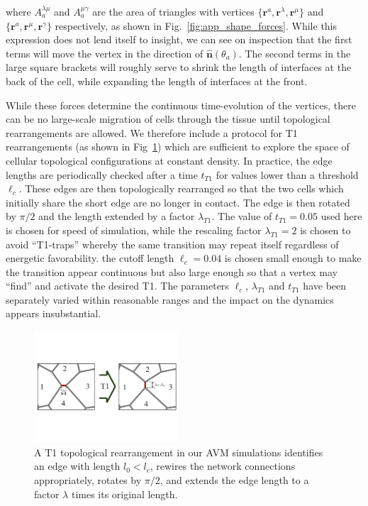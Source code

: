 \documentclass[
reprint
,aps
,amssymb
,amsmath
,superscriptaddress
]{revtex4-1}
\begin{document}
%
where $ A_a^{\lambda\mu}  $ and $ A_a^{\mu\gamma} $ are the area of triangles with vertices $\{\mathbf{r}^a,\mathbf{r}^\lambda, \mathbf{r}^\mu  \}$ and $\{\mathbf{r}^a,\mathbf{r}^\mu, \mathbf{r}^\gamma  \}$ respectively, as shown in Fig.~\ref{fig:app_shape_forces}.
While this expression does not lend itself to insight, we can see on inspection that the first terms will move the vertex in the direction of $\mathbf{\hat{n}}(\theta_a)$. The second terms in the large square brackets will roughly serve to shrink the length of interfaces at the back of the cell, while expanding the length of interfaces at the front. 

While these forces determine the continuous time-evolution of the vertices, there can be no large-scale migration of cells through the tissue until topological rearrangements are allowed. We therefore include a protocol for T1 rearrangements (as shown in Fig~\ref{fig:t1}) which are sufficient to explore the space of cellular topological configurations at constant density. In practice, the edge lengths are periodically checked after a time $t_{T1}$ for values lower than a threshold $\ell_c$. These edges are then topologically rearranged so that the two cells which initially share the short edge are no longer in contact. The edge is then rotated by $\pi/2$ and the length extended by a factor $\lambda_{T1}$. The value of $t_{T1}=0.05$ used here is chosen for speed of simulation, while the rescaling factor $\lambda_{T1}=2$ is chosen to avoid ``T1-traps'' whereby the same transition may repeat itself regardless of energetic favorability. the cutoff length $\ell_c = 0.04$ is chosen small enough to make the transition appear continuous but also large enough so that a vertex may ``find'' and activate the desired T1. The parameters $\ell_c$, $\lambda_{T1}$ and $ t_{T1}$ have been separately varied within reasonable ranges and the impact on the dynamics appears insubstantial. 

\begin{figure}[!t]  
\begin{center}
    \includegraphics[width=0.48\textwidth]{manuscript_images_t1_diagram.pdf}
    \caption{\label{fig:t1}A T1 topological rearrangement in our AVM simulations identifies an edge with length $l_0 < l_c$,  rewires the network connections appropriately, rotates by $\pi/2$, and extends the edge length to a factor $\lambda$ times its original length.}
    \end{center}
\end{figure}
\end{document}
